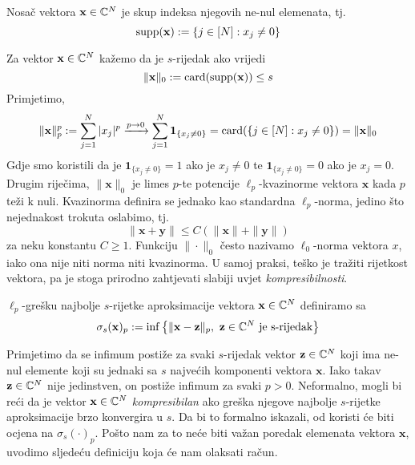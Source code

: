 \documentclass[a4paper,twoside,12pt]{memoir} %
\newcommand{\vect}[1]{\mathbf{#1}}
\renewcommand{\vec}{\vect}
\newcommand{\card}{\text{\normalfont{card}}}
\newcommand{\supp}{\text{\normalfont{supp}}}
\begin{document}
\begin{defn}
    Nosa\v{c} vektora $\vec{x} \in \C^{N}$ je skup indeksa njegovih ne-nul elemenata, tj.
    $$\supp(\vec{x}):=\{j\in[N]:x_j \neq 0 \}$$
\end{defn}

\noindent Za vektor $\vec{x}\in\C^{N}$ ka\v{z}emo da je $s$-rijedak ako vrijedi $$\|\vec{x}\|_0 := \card(\supp(\vec{x})) \leq s$$
Primjetimo,
$$\|\vec{x}\|_p^p := \sum_{j=1}^N|x_j|^p \xrightarrow{p\rightarrow 0} \sum_{j=1}^N\mathbf{1}_{\{x_j \neq 0\}} = \card(\{j \in [N]:x_j \neq 0\}) = \|\vec{x}\|_0$$
Gdje smo koristili da je $\mathbf{1}_{\{x_j \neq 0\}} = 1$  ako je $x_j \neq 0$ te $\mathbf{1}_{\{x_j \neq 0\}} = 0$  ako je $x_j = 0$. Drugim rije\v{c}ima, $\|\vec{x}\|_0$ je limes $p$-te potencije $\ell_p$-kvazinorme vektora $\vec{x}$ kada $p$ te\v{z}i k nuli. Kvazinorma definira se jednako kao standardna $\ell_p$-norma, jedino \v{s}to nejednakost trokuta oslabimo, tj. 
$$\|\vec{x}+\vec{y}\|\leq C(\|\vec{x}\|+\|\vec{y}\|)$$ 
za neku konstantu $C \geq 1$.
Funkciju $\|\cdot\|_0$ \v{c}esto nazivamo $\ell_0$-norma vektora $x$, iako  ona nije niti norma niti kvazinorma. U samoj praksi, te\v{s}ko je tra\v{z}iti rijetkost vektora, pa je stoga prirodno zahtjevati slabiji uvjet \textit{kompresibilnosti}.  
\begin{defn}\label{greska_naj_s_aprox}
    $\ell_p$-gre\v{s}ku najbolje $s$-rijetke aproksimacije vektora $\vec{x}\in\C^{N}$ definiramo sa 
    $$\sigma_s(\vec{x})_p := \inf\big\{\|\vec{x}-\vec{z}\|_p,\ \vec{z} \in \C^{N} \ \text{je s-rijedak}\big\}$$
\end{defn}
\indent Primjetimo da se infimum posti\v{z}e za svaki $s$-rijedak vektor $\vec{z} \in \C^{N}$ koji ima ne-nul elemente koji su jednaki sa $s$ najve\'cih komponenti vektora $\vec{x}$. Iako takav $\vec{z} \in \C^{N}$ nije jedinstven, on posti\v{z}e infimum za svaki $p > 0$. Neformalno, mogli bi re\'ci da je vektor $\vec{x} \in \C^{N}$ \textit{kompresibilan} ako gre\v{s}ka njegove najbolje $s$-rijetke aproksimacije brzo konvergira u $s$. Da bi to formalno iskazali, od koristi \'ce biti ocjena na $\sigma_s(\cdot)_p$. Po\v{s}to nam za to ne\'ce biti va\v{z}an poredak elemenata vektora $\vec{x}$, uvodimo sljede\'cu definiciju koja \'ce nam olaksati ra\v{c}un.
\end{document}
